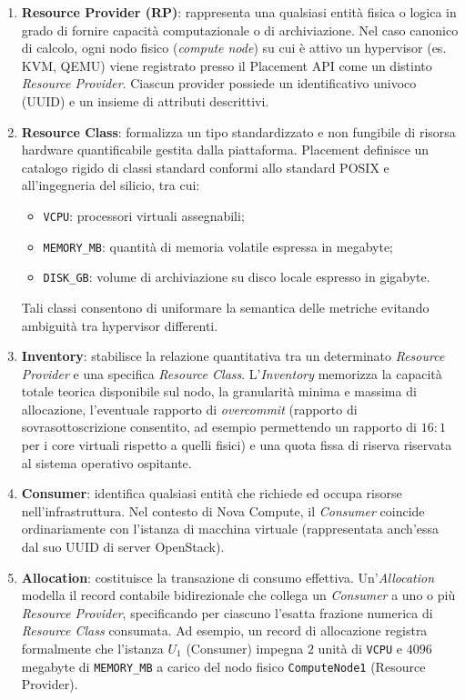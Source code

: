 \documentclass[11pt, a4paper]{article}
\begin{document}
\begin{enumerate}[leftmargin=*]
    \item \textbf{Resource Provider (RP)}: rappresenta una qualsiasi entità fisica o logica in grado di fornire capacità computazionale o di archiviazione. Nel caso canonico di calcolo, ogni nodo fisico (\emph{compute node}) su cui è attivo un hypervisor (es. KVM, QEMU) viene registrato presso il Placement API come un distinto \emph{Resource Provider}. Ciascun provider possiede un identificativo univoco (UUID) e un insieme di attributi descrittivi.

    \item \textbf{Resource Class}: formalizza un tipo standardizzato e non fungibile di risorsa hardware quantificabile gestita dalla piattaforma. Placement definisce un catalogo rigido di classi standard conformi allo standard POSIX e all'ingegneria del silicio, tra cui:
    \begin{itemize}
        \item \texttt{VCPU}: processori virtuali assegnabili;
        \item \texttt{MEMORY\_MB}: quantità di memoria volatile espressa in megabyte;
        \item \texttt{DISK\_GB}: volume di archiviazione su disco locale espresso in gigabyte.
    \end{itemize}
    Tali classi consentono di uniformare la semantica delle metriche evitando ambiguità tra hypervisor differenti.

    \item \textbf{Inventory}: stabilisce la relazione quantitativa tra un determinato \emph{Resource Provider} e una specifica \emph{Resource Class}. L'\emph{Inventory} memorizza la capacità totale teorica disponibile sul nodo, la granularità minima e massima di allocazione, l'eventuale rapporto di \emph{overcommit} (rapporto di sovrasottoscrizione consentito, ad esempio permettendo un rapporto di $16:1$ per i core virtuali rispetto a quelli fisici) e una quota fissa di riserva riservata al sistema operativo ospitante.

    \item \textbf{Consumer}: identifica qualsiasi entità che richiede ed occupa risorse nell'infrastruttura. Nel contesto di Nova Compute, il \emph{Consumer} coincide ordinariamente con l'istanza di macchina virtuale (rappresentata anch'essa dal suo UUID di server OpenStack).

    \item \textbf{Allocation}: costituisce la transazione di consumo effettiva. Un'\emph{Allocation} modella il record contabile bidirezionale che collega un \emph{Consumer} a uno o più \emph{Resource Provider}, specificando per ciascuno l'esatta frazione numerica di \emph{Resource Class} consumata. Ad esempio, un record di allocazione registra formalmente che l'istanza $U_1$ (Consumer) impegna $2$ unità di \texttt{VCPU} e $4096$ megabyte di \texttt{MEMORY\_MB} a carico del nodo fisico \texttt{ComputeNode1} (Resource Provider).
\end{enumerate}
\end{document}

